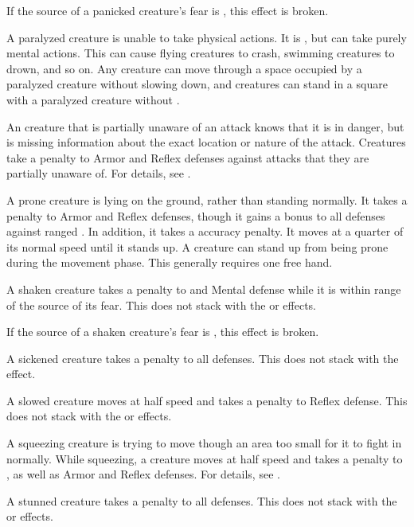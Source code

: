 If the source of a panicked creature's fear is , this effect is broken.

 A paralyzed creature is unable to take physical actions. It is \helpless, but can take purely mental actions. This can cause flying creatures to crash, swimming creatures to drown, and so on. Any creature can move through a space occupied by a paralyzed creature without slowing down, and creatures can stand in a square with a paralyzed creature without \squeezing.

 An creature that is partially unaware of an attack knows that it is in danger, but is missing information about the exact location or nature of the attack.
Creatures take a  penalty to Armor and Reflex defenses against attacks that they are partially unaware of.
For details, see .

 A prone creature is lying on the ground, rather than standing normally.
It takes a  penalty to Armor and Reflex defenses, though it gains a  bonus to all defenses against ranged .
In addition, it takes a  accuracy penalty.
It moves at a quarter of its normal speed until it stands up.
A creature can stand up from being prone during the movement phase.
This generally requires one free hand.

 A shaken creature takes a  penalty to  and Mental defense while it is within \rngmed range of the source of its fear.
This does not stack with the \frightened or \panicked effects.

If the source of a shaken creature's fear is , this effect is broken.

 A sickened creature takes a  penalty to all defenses.
This does not stack with the \nauseated effect.

 A slowed creature moves at half speed and takes a  penalty to Reflex defense.
This does not stack with the \decelerated or \immobilized effects.

 A squeezing creature is trying to move though an area too small for it to fight in normally.
While squeezing, a creature moves at half speed and takes a  penalty to , as well as Armor and Reflex defenses.
For details, see .

 A stunned creature takes a  penalty to all defenses.
This does not stack with the \dazed or \confused effects.

